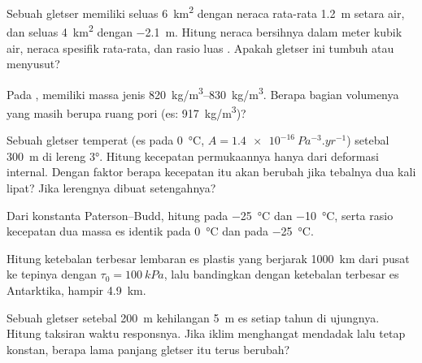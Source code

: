 \begin{exercise}[$\star$]\label{exo:b3:glaciology:3}
Sebuah gletser memiliki  seluas \qty{6}{km^2} dengan neraca rata-rata
\qty{+1.2}{m} setara air, dan  seluas \qty{4}{km^2} dengan
\qty{-2.1}{m}. Hitung neraca bersihnya dalam meter kubik air, neraca spesifik rata-rata,
dan rasio luas . Apakah gletser ini tumbuh atau
menyusut?
\end{exercise}

\begin{exercise}[$\star$]\label{exo:b3:glaciology:4}
Pada ,  memiliki massa jenis \qtyrange{820}{830}{kg/m^3}.
Berapa bagian volumenya yang masih berupa ruang pori (es:
\qty{917}{kg/m^3})?
\end{exercise}

\begin{exercise}[$\star\star$]\label{exo:b3:glaciology:5}
Sebuah gletser temperat (es pada \qty{0}{\celsius}, $A =
\qty{1.4e-16}{Pa^{-3}.yr^{-1}}$) setebal \qty{300}{m} di lereng
\ang{3}. Hitung kecepatan permukaannya hanya dari deformasi internal. Dengan
faktor berapa kecepatan itu akan berubah jika tebalnya dua kali lipat? Jika lerengnya
dibuat setengahnya?
\end{exercise}

\begin{exercise}[$\star\star$]\label{exo:b3:glaciology:6}
Dari konstanta Paterson--Budd, hitung  pada
\qty{-25}{\celsius} dan \qty{-10}{\celsius}, serta rasio kecepatan dua
massa es identik pada \qty{0}{\celsius} dan pada \qty{-25}{\celsius}.
\end{exercise}

\begin{exercise}[$\star\star$]\label{exo:b3:glaciology:7}
Hitung ketebalan terbesar lembaran es plastis yang berjarak \qty{1000}{km}
dari pusat ke tepinya dengan $\tau_0 = \qty{100}{kPa}$, lalu bandingkan dengan
ketebalan terbesar es Antarktika, hampir \qty{4.9}{km}.
\end{exercise}

\begin{exercise}[$\star\star$]\label{exo:b3:glaciology:8}
Sebuah gletser setebal \qty{200}{m} kehilangan \qty{5}{m} es setiap tahun di ujungnya.
Hitung taksiran waktu responsnya. Jika iklim menghangat mendadak lalu tetap
konstan, berapa lama panjang gletser itu terus berubah?
\end{exercise}

